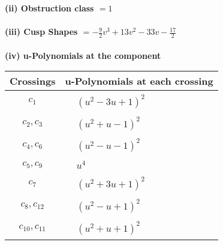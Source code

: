 \documentclass[1p]{elsarticle_modified}
\theoremstyle{definition}
\begin{document}
\flushleft \textbf{(ii) Obstruction class $= 1$}\\~\\
\flushleft \textbf{(iii) Cusp Shapes $= -\frac{9}{2} v^3+13 v^2-33 v-\frac{17}{2}$}\\~\\
\newpage\renewcommand{\arraystretch}{1}
\flushleft \textbf{(iv) u-Polynomials at the component}\newline \\
\begin{tabular}{m{50pt}|m{274pt}}
Crossings & \hspace{64pt}u-Polynomials at each crossing \\
\hline $$\begin{aligned}c_{1}\end{aligned}$$&$\begin{aligned}
&(u^2-3 u+1)^2
\end{aligned}$\\
\hline $$\begin{aligned}c_{2},c_{3}\end{aligned}$$&$\begin{aligned}
&(u^2+u-1)^2
\end{aligned}$\\
\hline $$\begin{aligned}c_{4},c_{6}\end{aligned}$$&$\begin{aligned}
&(u^2- u-1)^2
\end{aligned}$\\
\hline $$\begin{aligned}c_{5},c_{9}\end{aligned}$$&$\begin{aligned}
&u^4
\end{aligned}$\\
\hline $$\begin{aligned}c_{7}\end{aligned}$$&$\begin{aligned}
&(u^2+3 u+1)^2
\end{aligned}$\\
\hline $$\begin{aligned}c_{8},c_{12}\end{aligned}$$&$\begin{aligned}
&(u^2- u+1)^2
\end{aligned}$\\
\hline $$\begin{aligned}c_{10},c_{11}\end{aligned}$$&$\begin{aligned}
&(u^2+u+1)^2
\end{aligned}$\\
\hline
\end{tabular}\\~\\
\end{document}
